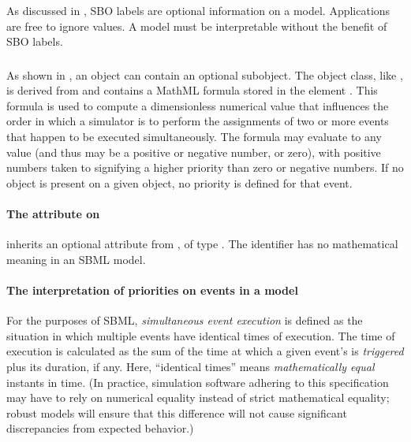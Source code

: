 As discussed in , SBO labels are optional
information on a model.  Applications are free to ignore
 values.  A model must be interpretable without the
benefit of SBO labels.

\subsubsection{}
\label{sec:event-priority}

As shown in , an \Event object can contain
an optional \Priority subobject.  The \Priority object class, like
\Delay, is derived from \SBase and contains a MathML formula
stored in the element .  This formula is used to
compute a dimensionless numerical value that influences the order
in which a simulator is to perform the assignments of two or more
events that happen to be executed simultaneously.  The formula may
evaluate to any  value (and thus may be a positive
or negative number, or zero), with positive numbers taken to
signifying a higher priority than zero or negative numbers.  If no
\Priority object is present on a given \Event object, no priority
is defined for that event.



\begin{blockChanged}
\paragraph{The  attribute on }
\label{sec:priority-id}

\Priority inherits an optional  attribute from \SBase, of type .  The identifier has no mathematical meaning in an SBML \thisLV model.
\end{blockChanged}


\paragraph{The interpretation of priorities on events in a model}

For the purposes of SBML, \emph{simultaneous event execution} is
defined as the situation in which multiple events have identical
times of execution.  The time of execution is calculated as the
sum of the time at which a given event's \Trigger is \emph{triggered}
plus its \Delay duration, if any.  Here, ``identical times'' means
\emph{mathematically equal} instants in time.  (In practice,
simulation software adhering to this specification may have to
rely on numerical equality instead of strict mathematical
equality; robust models will ensure that this difference will not
cause significant discrepancies from expected behavior.)

